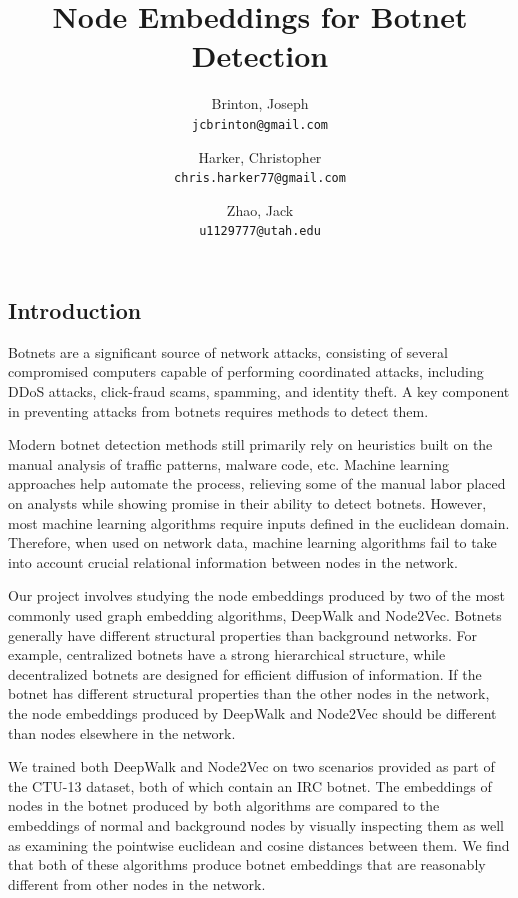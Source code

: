 \documentclass[10pt]{article}
\title{Node Embeddings for Botnet Detection}
\author{
	Brinton, Joseph\\
	\texttt{jcbrinton@gmail.com}
	\and
	Harker, Christopher\\
	\texttt{chris.harker77@gmail.com}
	\and
	Zhao, Jack\\
	\texttt{u1129777@utah.edu}
}
\begin{document}
\maketitle

\begin{multicols}{2}

\section{Introduction}

Botnets are a significant source of network attacks, consisting of several compromised computers capable of performing coordinated attacks, including DDoS attacks, click-fraud scams, spamming, and identity theft. A key component in preventing attacks from botnets requires methods to detect them.

Modern botnet detection methods still primarily rely on heuristics built on the manual analysis of traffic patterns, malware code, etc. Machine learning approaches help automate the process, relieving some of the manual labor placed on analysts while showing promise in their ability to detect botnets. However, most machine learning algorithms require inputs defined in the euclidean domain. Therefore, when used on network data, machine learning algorithms fail to take into account crucial relational information between nodes in the network. 

Our project involves studying the node embeddings produced by two of the most commonly used graph embedding algorithms, DeepWalk and Node2Vec. Botnets generally have different structural properties than background networks. For example, centralized botnets have a strong hierarchical structure, while decentralized botnets are designed for efficient diffusion of information. If the botnet has different structural properties than the other nodes in the network, the node embeddings produced by DeepWalk and Node2Vec should be different than nodes elsewhere in the network. 

We trained both DeepWalk \cite{Perozzi} and Node2Vec \cite{Grover} on two scenarios provided as part of the CTU-13 \cite{Garcia} dataset, both of which contain an IRC botnet. The embeddings of nodes in the botnet produced by both algorithms are compared to the embeddings of normal and background nodes by visually inspecting them as well as examining the pointwise euclidean and cosine distances between them. We find that both of these algorithms produce botnet embeddings that are reasonably different from other nodes in the network. 


\end{multicols}
\end{document}
